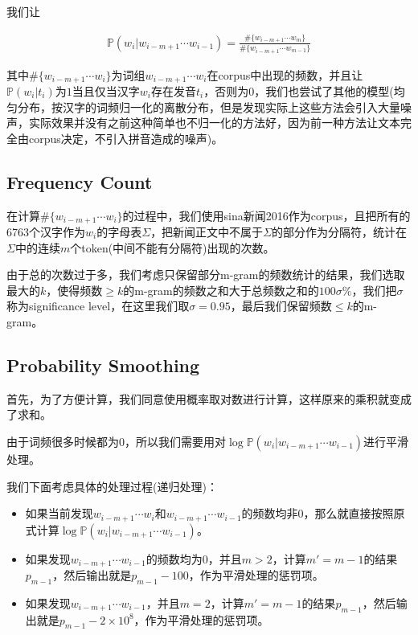 \documentclass{article}
\begin{document}
我们让

\begin{eqnarray}
	\mathbb{P}(w_i\lvert w_{i-m+1}\cdots w_{i-1}) = \frac{\#\{w_{i-m+1}\cdots w_{m}\}}{\#\{w_{i-m+1}\cdots w_{m-1}\}}
\end{eqnarray}

其中$\#\{w_{i-m+1}\cdots w_{i}\}$为词组$w_{i-m+1}\cdots w_{i}$在corpus中出现的频数，并且让$\mathbb{P}(w_i \lvert t_i)$为$1$当且仅当汉字$w_i$存在发音$t_i$，否则为$0$，我们也尝试了其他的模型(均匀分布，按汉字的词频归一化的离散分布，但是发现实际上这些方法会引入大量噪声，实际效果并没有之前这种简单也不归一化的方法好，因为前一种方法让文本完全由corpus决定，不引入拼音造成的噪声)。

\subsection{Frequency Count}

在计算$\#\{w_{i-m+1}\cdots w_{i}\}$的过程中，我们使用sina新闻2016作为corpus，且把所有的6763个汉字作为$w_i$的字母表$\Sigma$，把新闻正文中不属于$\Sigma$的部分作为分隔符，统计在$\Sigma$中的连续$m$个token(中间不能有分隔符)出现的次数。

由于总的次数过于多，我们考虑只保留部分m-gram的频数统计的结果，我们选取最大的$k$，使得频数$\ge k$的m-gram的频数之和大于总频数之和的$100 \sigma\%$，我们把$\sigma$称为significance level，在这里我们取$\sigma=0.95$，最后我们保留频数$\le k$的m-gram。

\subsection{Probability Smoothing}

首先，为了方便计算，我们同意使用概率取对数进行计算，这样原来的乘积就变成了求和。

由于词频很多时候都为0，所以我们需要用对$\log\mathbb{P}(w_i\lvert w_{i-m+1}\cdots w_{i-1})$进行平滑处理。

我们下面考虑具体的处理过程(递归处理)：

\begin{itemize}
	\item 如果当前发现$w_{i-m+1}\cdots w_{i}$和$w_{i-m+1}\cdots w_{i-1}$的频数均非0，那么就直接按照原式计算$\log\mathbb{P}(w_i\lvert w_{i-m+1}\cdots w_{i-1})$。
	\item 如果发现$w_{i-m+1}\cdots w_{i-1}$的频数均为0，并且$m>2$，计算$m'=m-1$的结果$p_{m-1}$，然后输出就是$p_{m-1}-100$，作为平滑处理的惩罚项。
	\item 如果发现$w_{i-m+1}\cdots w_{i-1}$，并且$m=2$，计算$m'=m-1$的结果$p_{m-1}$，然后输出就是$p_{m-1}-2\times 10^8$，作为平滑处理的惩罚项。
\end{itemize}
\end{document}
